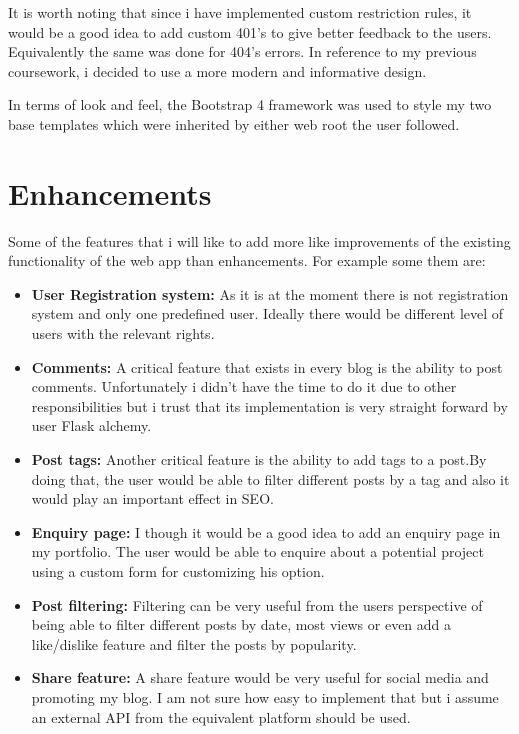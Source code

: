 \documentclass[10pt, a4paper]{article}
\begin{document}
	It is worth noting that since i have implemented custom restriction rules, it would be a good idea to add custom 401's to give better feedback to the users. Equivalently the same was done for 404's errors. In reference to my previous coursework, i decided to use a more modern and informative design.
	
	In terms of look and feel, the Bootstrap 4 framework was used to style my two base templates which were inherited by either web root the user followed.
	
	\section{Enhancements}
    
    Some of the features that i will like to add more like improvements of the existing functionality of the web app than enhancements. For  example some them are:
    \begin{itemize}
      \item \textbf{User Registration system:} As it is at the moment there is not registration system and only one predefined user. Ideally there would be different level of users with the relevant rights.
      \item \textbf{Comments:} A critical feature that exists in every blog is the ability to post comments. Unfortunately i didn't have the time to do it due to other responsibilities but i trust that its implementation is very straight forward by user Flask alchemy.
      \item \textbf{Post tags:} Another critical feature is the ability to add tags to a post.By doing that, the user would be able to filter different posts by a tag and also it would play an important effect in SEO.
      \item \textbf{Enquiry page:} I though it would be a good idea to add an enquiry page in my portfolio. The user would be able to enquire about a potential project using a custom form for customizing his option.
      \item \textbf{Post filtering:} Filtering can be very useful from the users perspective of being able to filter different posts by date, most views or even add a like/dislike feature and filter the posts by popularity.
      \item \textbf{Share feature:} A share feature would be very useful for social media and promoting my blog. I am not sure how easy to implement that but i assume an external API from the equivalent platform should be used.
    \end{itemize}
    
\end{document}
